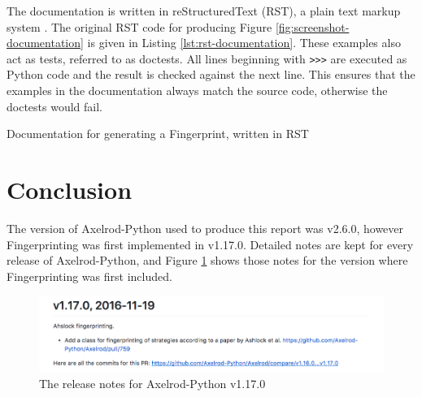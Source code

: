 The documentation is written in reStructuredText (RST), a plain text markup system \cite{rst}.
The original RST code for producing Figure \ref{fig:screenshot-documentation} is given in Listing \ref{lst:rst-documentation}.
These examples also act as tests, referred to as doctests.
All lines beginning with \texttt{>>>} are executed as Python code and the result is checked against the next line.
This ensures that the examples in the documentation always match the source code, otherwise the doctests would fail.

\begin{listing}[hbtp!]
\begin{SourceDocs}
Here is how to create a fingerprint of :code:`WinStayLoseShift` using
:code:`TitForTat` as a probe::

    >>> import axelrod as axl
    >>> axl.seed(0)  # Fingerprinting is a random process
    >>> strategy = axl.WinStayLoseShift
    >>> probe = axl.TitForTat
    >>> af = axl.AshlockFingerprint(strategy, probe)
    >>> data = af.fingerprint(turns=10, repetitions=2, step=0.2)
    >>> data
    {...
    >>> data[(0, 0)]
    3.0

The :code:`fingerprint` method returns a dictionary mapping coordinates of the
form :code:`(x, y)` to the mean score for the corresponding interactions.
We can then plot the above to get::

    >>> p = af.plot()
    >>> p.show()

.. image:: _static/fingerprinting/WSLS_small.png
     :width: 100%
     :align: center
\end{SourceDocs}
\caption{Documentation for generating a Fingerprint, written in RST}
\label{lst:rst-documentation}
\end{listing}



\section{Conclusion}
The version of Axelrod-Python used to produce this report was v2.6.0, however Fingerprinting was first implemented in v1.17.0.
Detailed notes are kept for every release of Axelrod-Python, and Figure \ref{fig:release-notes} shows those notes for the version where Fingerprinting was first included.

\begin{figure}[htbp!]
\includegraphics[width=\textwidth]{../img/screenshots/changelog.png}
\caption{The release notes for Axelrod-Python v1.17.0}
\label{fig:release-notes}
\end{figure}
